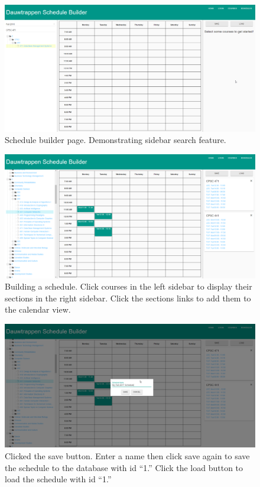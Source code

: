 \documentclass[twoside=false,a4paper,11pt]{article}
\theoremstyle{mytheor}
\begin{document}
\begin{figure}[h!]
	\includegraphics[width=\textwidth]{scheduleSearch.png}
	\caption{Schedule builder page. Demonstrating sidebar search feature.}
\end{figure}
\begin{figure}[h!]
	\includegraphics[width=\textwidth]{scheduleCourses.png}
	\caption{Building a schedule. Click courses in the left sidebar to display their sections in the right sidebar. Click the sections links to add them to the calendar view.}
\end{figure}
\begin{figure}[h!]
	\includegraphics[width=\textwidth]{scheduleSave.png}
	\caption{Clicked the save button. Enter a name then click save again to save the schedule to the database with id ``1.'' Click the load button to load the schedule with id ``1.''}
\end{figure}
\end{document}
